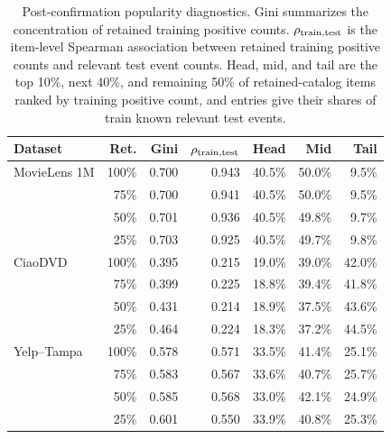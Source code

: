 \begin{table}[H]
\centering
\caption{Post-confirmation popularity diagnostics. Gini summarizes the concentration of retained training positive counts. $\rho_{\rm train,test}$ is the item-level Spearman association between retained training positive counts and relevant test event counts. Head, mid, and tail are the top 10\%, next 40\%, and remaining 50\% of retained-catalog items ranked by training positive count, and entries give their shares of train known relevant test events.}
\label{tab:popularity-diagnostics}
\small
\begin{tabular}{@{}lrrrrrr@{}}
\toprule
Dataset & Ret. & Gini & $\rho_{\rm train,test}$ & Head & Mid & Tail \\
\midrule
MovieLens 1M & 100\% & 0.700 & 0.943 & 40.5\% & 50.0\% & 9.5\% \\
 & 75\% & 0.700 & 0.941 & 40.5\% & 50.0\% & 9.5\% \\
 & 50\% & 0.701 & 0.936 & 40.5\% & 49.8\% & 9.7\% \\
 & 25\% & 0.703 & 0.925 & 40.5\% & 49.7\% & 9.8\% \\
\addlinespace
CiaoDVD & 100\% & 0.395 & 0.215 & 19.0\% & 39.0\% & 42.0\% \\
 & 75\% & 0.399 & 0.225 & 18.8\% & 39.4\% & 41.8\% \\
 & 50\% & 0.431 & 0.214 & 18.9\% & 37.5\% & 43.6\% \\
 & 25\% & 0.464 & 0.224 & 18.3\% & 37.2\% & 44.5\% \\
\addlinespace
Yelp--Tampa & 100\% & 0.578 & 0.571 & 33.5\% & 41.4\% & 25.1\% \\
 & 75\% & 0.583 & 0.567 & 33.6\% & 40.7\% & 25.7\% \\
 & 50\% & 0.585 & 0.568 & 33.0\% & 42.1\% & 24.9\% \\
 & 25\% & 0.601 & 0.550 & 33.9\% & 40.8\% & 25.3\% \\
\bottomrule
\end{tabular}
\end{table}
